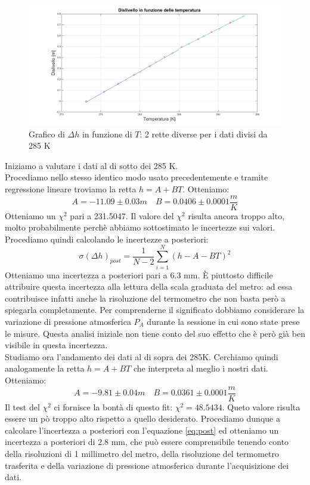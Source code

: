 \begin{figure}[H]
\centering
\includegraphics[width=\textwidth]{img/2}
\caption{Grafico di $\Delta h$ in funzione di $T$: 2 rette diverse per i dati divisi da 285 K}
\end{figure}

Iniziamo a valutare i dati al di sotto dei 285 K.\\
Procediamo nello stesso identico modo usato precedentemente e tramite regressione lineare troviamo la retta $h = A+BT$.
Otteniamo:
\[A = -11.09 \pm 0.03 m \quad  B = 0.0406\pm 0.0001 \frac{m}{K}\]
Otteniamo un $\chi^2$ pari a 231.5047. 
Il valore del $\chi^2$ risulta ancora troppo alto, molto probabilmente perchè abbiamo sottostimato le incertezze sui valori.
Procediamo quindi calcolando le incertezze a posteriori:
\begin{equation}
\label{eq:post}
\sigma(\Delta h)_{post} = \frac{1}{N-2}\sum_{i=1}^N(h-A-BT)^2
\end{equation}
Otteniamo una incertezza a posteriori pari a $6.3$ mm. 
È piuttosto difficile attribuire questa incertezza alla lettura della scala graduata del metro: ad essa contribuisce infatti anche la risoluzione del termometro che non basta però a spiegarla completamente. 
Per comprenderne il significato dobbiamo considerare la variazione di pressione atmosferica $P_A$ durante la sessione in cui sono state prese le misure. 
Questa analisi iniziale non tiene conto del suo effetto che è però già ben visibile in questa incertezza.\\
\newline
Studiamo ora l'andamento dei dati al di sopra dei 285K. 
Cerchiamo quindi analogamente la retta $h = A+BT$ che interpreta al meglio i nostri dati. 
Otteniamo:
\[A = -9.81 \pm 0.04 m \quad  B = 0.0361 \pm 0.0001 \frac{m}{K}\]
Il test del $\chi^2$ ci fornisce la bontà di questo fit: $\chi^2 = 48.5434$. 
Queto valore risulta essere un pò troppo alto rispetto a quello desiderato. 
Procediamo dunque a calcolare l'incertezza a posteriori con l'equazione \eqref{eq:post} ed otteniamo un incertezza a posteriori di $2.8$ mm, che può essere comprensibile tenendo conto della risoluzioni di 1 millimetro del metro, della risoluzione del termometro trasferita e della variazione di pressione atmosferica durante l'acquisizione dei dati.


